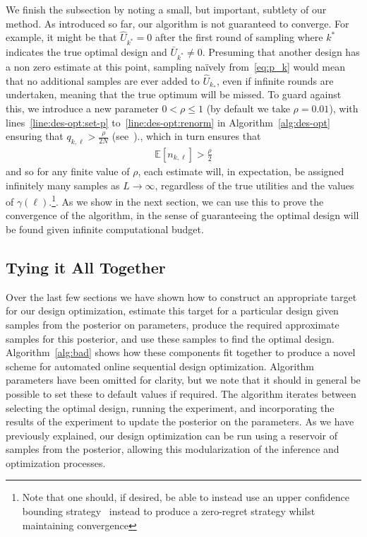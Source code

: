 We finish the subsection by noting a small, but important, subtlety of our method.  As introduced so far, our algorithm
is not guaranteed to converge.  For example, it might be that $\hat{U}_{k^*} =0$ after the first round
of sampling where $k^*$ indicates the true optimal design and $\bar{U}_{k^*} \ne0$.  
Presuming that another design has a non zero estimate at this point, sampling na\"{i}vely from~\eqref{eq:p_k} would 
mean that no additional samples are ever added to $\hat{U}_{k_*}$, even if infinite rounds are undertaken,
meaning that the true optimum will be missed.  To guard against this, we introduce a new parameter $0<\rho\le1$
(by default we take $\rho=0.01$), with lines~\ref{line:des-opt:set-p} to~\ref{line:des-opt:renorm} in Algorithm~\ref{alg:des-opt}
ensuring that $q_{k,\ell}>\frac{\rho}{2N}$ (see~\cite{vincent2017darc})., which in turn ensures that  
\begin{align}
\label{eq:nk-bound}
\mathbb{E}[n_{k,\ell}] > \frac{\rho }{2}
\end{align} 
and so for any finite value of $\rho$, each
estimate will, in expectation, be assigned infinitely many samples as $L\rightarrow\infty$, regardless
of the true utilities and the values of $\gamma(\ell)$.\footnote{Note that one should, if desired, be able to instead 
	use an upper confidence bounding strategy~\cite{auer2002using} instead to produce a zero-regret 
	strategy whilst maintaining convergence}.
As we show in the next section, we can
use this to prove the convergence of the algorithm, in the sense of guaranteeing the optimal design
will be found given infinite computational budget.

\subsection{Tying it All Together}
\label{sec:tying-together}

Over the last few sections we have shown how to construct an appropriate target for our design optimization,
estimate this target for a particular design given samples from the posterior on parameters,
produce the required approximate samples for this posterior, and use these samples to find the optimal design.
Algorithm~\ref{alg:bad} shows how these components fit together to produce a novel scheme for
automated online sequential design optimization.  Algorithm parameters have been omitted
for clarity, but we note that it should in general be possible to set these to default values if required.  
The algorithm iterates between selecting the optimal design,
running the experiment, and incorporating the results of the experiment to update the posterior on the
parameters.  As we have previously explained, our design optimization can be run using a reservoir of
samples from the posterior, allowing this modularization of the inference and optimization processes.

